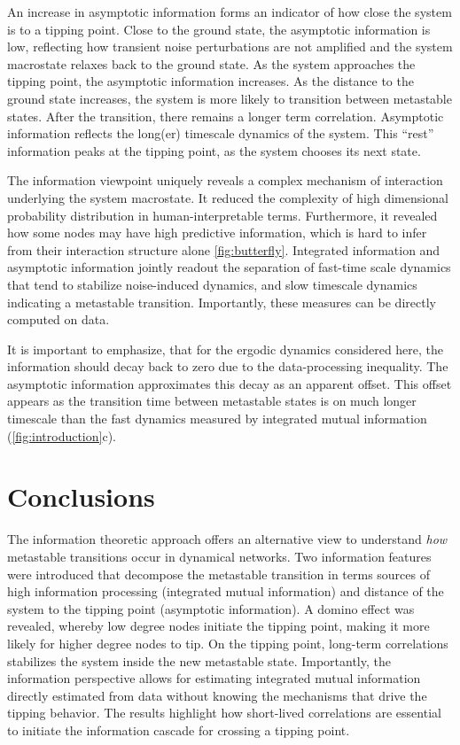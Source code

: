 \documentclass[a4paper, 11pt, twocolumn]{article}
\begin{document}
An increase in asymptotic  information forms an indicator of
how close  the system is  to a  tipping point. Close  to the
ground state, the asymptotic  information is low, reflecting
how transient noise perturbations  are not amplified and the
system macrostate relaxes  back to the ground  state. As the
system   approaches  the   tipping  point,   the  asymptotic
information increases.  As the distance to  the ground state
increases, the  system is more likely  to transition between
metastable  states. After  the transition,  there remains  a
longer term correlation. Asymptotic information reflects the
long(er)  timescale  dynamics  of the  system.  This  ``rest''
information  peaks  at  the  tipping point,  as  the  system
chooses its next state.

The  information   viewpoint  uniquely  reveals   a  complex
mechanism of  interaction underlying the  system macrostate.
It reduced  the complexity  of high  dimensional probability
distribution in  human-interpretable terms.  Furthermore, it
revealed   how  some   nodes   may   have  high   predictive
information, which  is hard to infer  from their interaction
structure alone \cref{fig:butterfly}. Integrated information
and asymptotic information jointly readout the separation of
fast-time   scale   dynamics    that   tend   to   stabilize
noise-induced   dynamics,   and  slow   timescale   dynamics
indicating  a  metastable   transition.  Importantly,  these
measures can be directly computed on data.

It is important to emphasize,  that for the ergodic dynamics
considered here,  the information should decay  back to zero
due  to  the   data-processing  inequality.  The  asymptotic
information approximates  this decay as an  apparent offset.
This  offset   appears  as   the  transition   time  between
metastable states is on much  longer timescale than the fast
dynamics   measured   by   integrated   mutual   information
(\cref{fig:introduction}{c}).

\section{Conclusions}
\label{sec:org7971cd6}
The information theoretic approach offers an alternative view to
understand \emph{how} metastable transitions occur in dynamical networks. Two
information features were introduced that decompose the metastable
transition in terms sources of high information processing (integrated
mutual information) and distance of the system to the tipping point
(asymptotic information). A domino effect was revealed, whereby low
degree nodes initiate the tipping point, making it more likely for
higher degree nodes to tip. On the tipping point, long-term correlations
stabilizes the system inside the new metastable state. Importantly, the
information perspective allows for estimating integrated mutual
information directly estimated from data without knowing the mechanisms
that drive the tipping behavior. The results highlight how short-lived
correlations are essential to initiate the information cascade for
crossing a tipping point.
\end{document}
